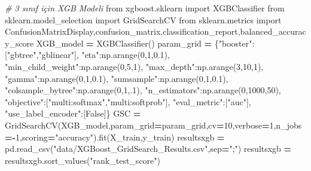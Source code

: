 \documentclass[12pt,twoside]{deuthesis}
\newenvironment{Shaded}{\begin{snugshade}}{\end{snugshade}}
\newcommand{\CommentTok}[1]{\textcolor[rgb]{0.56,0.35,0.01}{\textit{#1}}}
\newcommand{\DecValTok}[1]{\textcolor[rgb]{0.00,0.00,0.81}{#1}}
\newcommand{\FloatTok}[1]{\textcolor[rgb]{0.00,0.00,0.81}{#1}}
\newcommand{\ImportTok}[1]{#1}
\newcommand{\NormalTok}[1]{#1}
\newcommand{\OperatorTok}[1]{\textcolor[rgb]{0.81,0.36,0.00}{\textbf{#1}}}
\newcommand{\StringTok}[1]{\textcolor[rgb]{0.31,0.60,0.02}{#1}}
\newcommand{\VariableTok}[1]{\textcolor[rgb]{0.00,0.00,0.00}{#1}}
\begin{document}
\begin{Shaded}
\begin{Highlighting}[]
\CommentTok{\# 3 sınıf için XGB Modeli}
\ImportTok{from}\NormalTok{ xgboost.sklearn }\ImportTok{import}\NormalTok{ XGBClassifier}
\ImportTok{from}\NormalTok{ sklearn.model\_selection }\ImportTok{import}\NormalTok{ GridSearchCV}
\ImportTok{from}\NormalTok{ sklearn.metrics }\ImportTok{import}\NormalTok{ ConfusionMatrixDisplay,confusion\_matrix,classification\_report,balanced\_accuracy\_score}
\NormalTok{XGB\_model }\OperatorTok{=}\NormalTok{ XGBClassifier()}
\NormalTok{param\_grid }\OperatorTok{=}\NormalTok{ \{}\StringTok{"booster"}\NormalTok{:[}\StringTok{"gbtree"}\NormalTok{,}\StringTok{"gblinear"}\NormalTok{],}
              \StringTok{"eta"}\NormalTok{:np.arange(}\DecValTok{0}\NormalTok{,}\DecValTok{1}\NormalTok{,}\FloatTok{0.1}\NormalTok{),}
              \StringTok{"min\_child\_weight"}\NormalTok{:np.arange(}\DecValTok{0}\NormalTok{,}\DecValTok{5}\NormalTok{,}\DecValTok{1}\NormalTok{),}
              \StringTok{"max\_depth"}\NormalTok{:np.arange(}\DecValTok{3}\NormalTok{,}\DecValTok{10}\NormalTok{,}\DecValTok{1}\NormalTok{),}
              \StringTok{"gamma"}\NormalTok{:np.arange(}\DecValTok{0}\NormalTok{,}\DecValTok{1}\NormalTok{,}\FloatTok{0.1}\NormalTok{),}
              \StringTok{"sumsample"}\NormalTok{:np.arange(}\DecValTok{0}\NormalTok{,}\DecValTok{1}\NormalTok{,}\FloatTok{0.1}\NormalTok{),}
              \StringTok{"colsample\_bytree"}\NormalTok{:np.arange(}\DecValTok{0}\NormalTok{,}\DecValTok{1}\NormalTok{,}\FloatTok{.1}\NormalTok{),}
              \StringTok{"n\_estimators"}\NormalTok{:np.arange(}\DecValTok{0}\NormalTok{,}\DecValTok{1000}\NormalTok{,}\DecValTok{50}\NormalTok{),}
              \StringTok{"objective"}\NormalTok{:[}\StringTok{"multi:softmax"}\NormalTok{,}\StringTok{"multi:softprob"}\NormalTok{],}
              \StringTok{"eval\_metric"}\NormalTok{:[}\StringTok{"auc"}\NormalTok{],}
              \StringTok{"use\_label\_encoder"}\NormalTok{:[}\VariableTok{False}\NormalTok{]\}}
\NormalTok{GSC }\OperatorTok{=}\NormalTok{ GridSearchCV(XGB\_model,param\_grid}\OperatorTok{=}\NormalTok{param\_grid,cv}\OperatorTok{=}\DecValTok{10}\NormalTok{,verbose}\OperatorTok{=}\DecValTok{1}\NormalTok{,n\_jobs}\OperatorTok{={-}}\DecValTok{1}\NormalTok{,scoring}\OperatorTok{=}\StringTok{"accuracy"}\NormalTok{).fit(X\_train,y\_train)}
\NormalTok{resultsxgb }\OperatorTok{=}\NormalTok{ pd.read\_csv(}\StringTok{"data/XGBoost\_GridSearch\_Results.csv"}\NormalTok{,sep}\OperatorTok{=}\StringTok{";"}\NormalTok{)}
\NormalTok{resultsxgb }\OperatorTok{=}\NormalTok{ resultsxgb.sort\_values(}\StringTok{"rank\_test\_score"}\NormalTok{)}

\end{Highlighting}
\end{Shaded}
\end{document}
